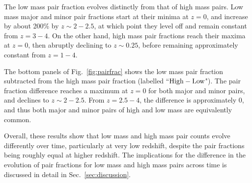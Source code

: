 \documentclass[twocolumn]{aastex631}
\begin{document}
    The low mass pair fraction evolves distinctly from that of high mass pairs.
    Low mass major and minor pair fractions start at their minima at $z=0$, and increase by about 200\% by $z\sim2-2.5$, at which point they level off and remain constant from $z=3-4$. 
    On the other hand, high mass pair fractions reach their maxima at $z=0$, then abruptly declining to $z\sim0.25$, before remaining approximately constant from $z=1-4$. 
    
    The bottom panels of Fig.~\ref{fig:pairfrac} shows the low mass pair fraction subtracted from the high mass pair fraction (labelled ``$\rm High-Low$").
    The pair fraction difference reaches a maximum at $z=0$ for both major and minor pairs, and declines to $z\sim2-2.5$. 
    From $z=2.5-4$, the difference is approximately 0, and thus both major and minor pairs of high and low mass are equivalently common. 
    
    Overall, these results show that low mass and high mass pair counts evolve differently over time, particularly at very low redshift, despite the pair fractions being roughly equal at higher redshift. 
    The implications for the difference in the evolution of pair fractions for low mass and high mass pairs across time is discussed in detail in Sec.~\ref{sec:discussion}.
    
\end{document}
